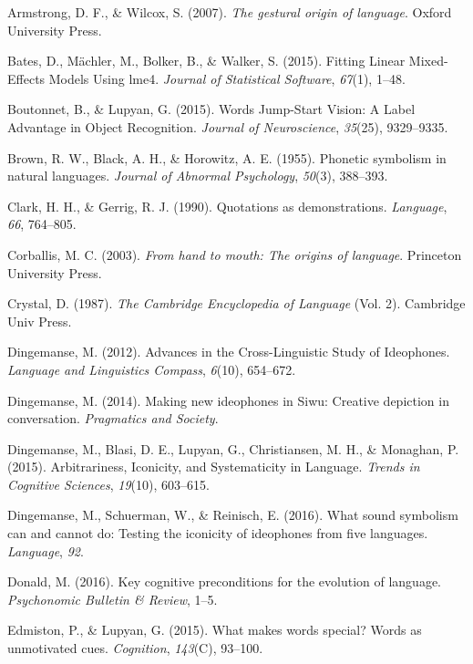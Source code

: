 \documentclass[english,floatsintext,man]{apa6}
\theoremstyle{definition}
\theoremstyle{definition}
\theoremstyle{remark}
\begin{document}
\hypertarget{ref-Armstrong:2007go}{}
Armstrong, D. F., \& Wilcox, S. (2007). \emph{The gestural origin of
language}. Oxford University Press.

\hypertarget{ref-lme4:2015}{}
Bates, D., Mächler, M., Bolker, B., \& Walker, S. (2015). Fitting Linear
Mixed-Effects Models Using lme4. \emph{Journal of Statistical Software},
\emph{67}(1), 1--48.

\hypertarget{ref-Boutonnet:2015fz}{}
Boutonnet, B., \& Lupyan, G. (2015). Words Jump-Start Vision: A Label
Advantage in Object Recognition. \emph{Journal of Neuroscience},
\emph{35}(25), 9329--9335.

\hypertarget{ref-Brown:1955wy}{}
Brown, R. W., Black, A. H., \& Horowitz, A. E. (1955). Phonetic
symbolism in natural languages. \emph{Journal of Abnormal Psychology},
\emph{50}(3), 388--393.

\hypertarget{ref-Clark:1990cl}{}
Clark, H. H., \& Gerrig, R. J. (1990). Quotations as demonstrations.
\emph{Language}, \emph{66}, 764--805.

\hypertarget{ref-Corballis:2003ha}{}
Corballis, M. C. (2003). \emph{From hand to mouth: The origins of
language}. Princeton University Press.

\hypertarget{ref-Crystal:1987en}{}
Crystal, D. (1987). \emph{The Cambridge Encyclopedia of Language} (Vol.
2). Cambridge Univ Press.

\hypertarget{ref-Dingemanse:2012fc}{}
Dingemanse, M. (2012). Advances in the Cross-Linguistic Study of
Ideophones. \emph{Language and Linguistics Compass}, \emph{6}(10),
654--672.

\hypertarget{ref-Dingemanse:2014gj}{}
Dingemanse, M. (2014). Making new ideophones in Siwu: Creative depiction
in conversation. \emph{Pragmatics and Society}.

\hypertarget{ref-Dingemanse:2015cu}{}
Dingemanse, M., Blasi, D. E., Lupyan, G., Christiansen, M. H., \&
Monaghan, P. (2015). Arbitrariness, Iconicity, and Systematicity in
Language. \emph{Trends in Cognitive Sciences}, \emph{19}(10), 603--615.

\hypertarget{ref-Dingemanse:2016vd}{}
Dingemanse, M., Schuerman, W., \& Reinisch, E. (2016). What sound
symbolism can and cannot do: Testing the iconicity of ideophones from
five languages. \emph{Language}, \emph{92}.

\hypertarget{ref-Donald:2016kd}{}
Donald, M. (2016). Key cognitive preconditions for the evolution of
language. \emph{Psychonomic Bulletin \& Review}, 1--5.

\hypertarget{ref-Edmiston:2015he}{}
Edmiston, P., \& Lupyan, G. (2015). What makes words special? Words as
unmotivated cues. \emph{Cognition}, \emph{143}(C), 93--100.
\end{document}
